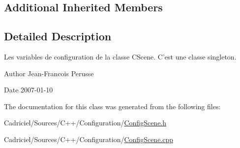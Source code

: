 \subsection*{Additional Inherited Members}


\subsection{Detailed Description}
Les variables de configuration de la classe C\-Scene. C'est une classe singleton. 

\begin{DoxyAuthor}{Author}
Jean-\/\-Francois Perusse 
\end{DoxyAuthor}
\begin{DoxyDate}{Date}
2007-\/01-\/10 
\end{DoxyDate}


The documentation for this class was generated from the following files\-:\begin{DoxyCompactItemize}
\item 
Cadriciel/\-Sources/\-C++/\-Configuration/\hyperlink{_config_scene_8h}{Config\-Scene.\-h}\item 
Cadriciel/\-Sources/\-C++/\-Configuration/\hyperlink{_config_scene_8cpp}{Config\-Scene.\-cpp}\end{DoxyCompactItemize}
